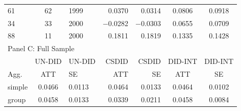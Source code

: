 \begin{table}
\begin{tabular}{lclrrcc}
61      & 62      & 1999 & 0.0370  & 0.0314  & 0.0806  & 0.0918  \\
34      & 33      & 2000 & $-0$.0282 & $-0$.0303 & 0.0655  & 0.0709  \\
88      & 11      & 2000 & 0.1811  & 0.1819  & 0.1335  & 0.1428 \\
\hline
\multicolumn{3}{l}{Panel C: Full Sample} & & & & \\
\hline
 & UN-DID & UN-DID & CSDID & CSDID & DID-INT & DID-INT \\
Agg. & ATT & SE & ATT & SE & ATT & SE \\
simple & 0.0466 & 0.0113 & 0.0464 & 0.0133 & 0.0464 & 0.0102 \\
group  & 0.0458 & 0.0133 & 0.0339 & 0.0211 & 0.0458 & 0.0084 \\

 \hline
 \hline
\end{tabular}
\label{tab:merit}
\end{table}
